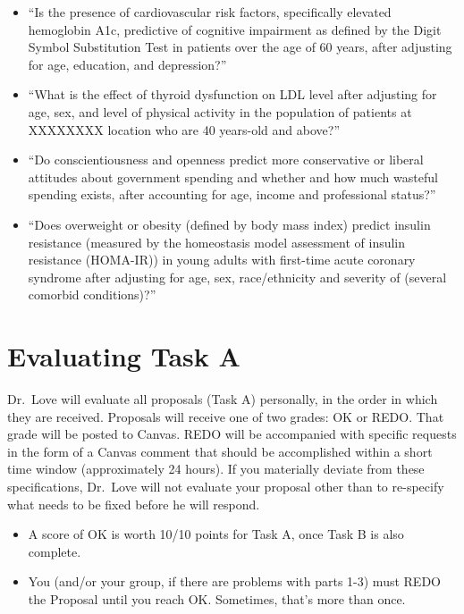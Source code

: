 \documentclass[]{book}
\providecommand{\tightlist}{%
  \setlength{\itemsep}{0pt}\setlength{\parskip}{0pt}}
\theoremstyle{definition}
\theoremstyle{definition}
\theoremstyle{definition}
\theoremstyle{remark}
\begin{document}
\begin{itemize}
\tightlist
\item
  ``Is the presence of cardiovascular risk factors, specifically
  elevated hemoglobin A1c, predictive of cognitive impairment as defined
  by the Digit Symbol Substitution Test in patients over the age of 60
  years, after adjusting for age, education, and depression?''
\item
  ``What is the effect of thyroid dysfunction on LDL level after
  adjusting for age, sex, and level of physical activity in the
  population of patients at XXXXXXXX location who are 40 years-old and
  above?''
\item
  ``Do conscientiousness and openness predict more conservative or
  liberal attitudes about government spending and whether and how much
  wasteful spending exists, after accounting for age, income and
  professional status?''
\item
  ``Does overweight or obesity (defined by body mass index) predict
  insulin resistance (measured by the homeostasis model assessment of
  insulin resistance (HOMA-IR)) in young adults with first-time acute
  coronary syndrome after adjusting for age, sex, race/ethnicity and
  severity of (several comorbid conditions)?''
\end{itemize}

\hypertarget{evaluating-task-a}{%
\section{Evaluating Task A}\label{evaluating-task-a}}

Dr.~Love will evaluate all proposals (Task A) personally, in the order
in which they are received. Proposals will receive one of two grades: OK
or REDO. That grade will be posted to Canvas. REDO will be accompanied
with specific requests in the form of a Canvas comment that should be
accomplished within a short time window (approximately 24 hours). If you
materially deviate from these specifications, Dr.~Love will not evaluate
your proposal other than to re-specify what needs to be fixed before he
will respond.

\begin{itemize}
\tightlist
\item
  A score of OK is worth 10/10 points for Task A, once Task B is also
  complete.
\item
  You (and/or your group, if there are problems with parts 1-3) must
  REDO the Proposal until you reach OK. Sometimes, that's more than
  once.
\end{itemize}
\end{document}

